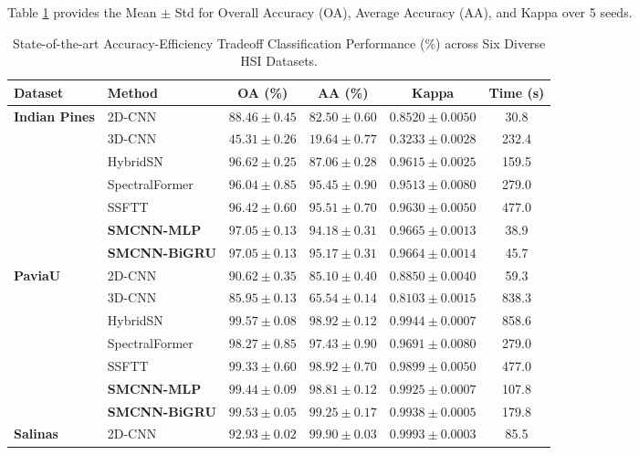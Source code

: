 \documentclass[pdflatex,sn-mathphys-num,iicol]{sn-jnl}
\begin{document}
Table \ref{tab:sota_results} provides the Mean $\pm$ Std for Overall Accuracy (OA), Average Accuracy (AA), and Kappa over 5 seeds.

\begin{table}[htbp]
\centering
\caption{State-of-the-art Accuracy-Efficiency Tradeoff Classification Performance (\%) across Six Diverse HSI Datasets.}
\label{tab:sota_results}
\footnotesize
\begin{tabular}{llcccc}
\toprule
\textbf{Dataset} & \textbf{Method} & \textbf{OA (\%)} & \textbf{AA (\%)} & \textbf{Kappa} & \textbf{Time (s)} \\
\midrule
\multirow{5}{*}{\textbf{Indian Pines}} 
 & 2D-CNN & $88.46 \pm 0.45$ & $82.50 \pm 0.60$ & $0.8520 \pm 0.0050$ & 30.8 \\
 & 3D-CNN & $45.31 \pm 0.26$ & $19.64 \pm 0.77$ & $0.3233 \pm 0.0028$ & 232.4 \\
 & HybridSN & $96.62 \pm 0.25$ & $87.06 \pm 0.28$ & $0.9615 \pm 0.0025$ & 159.5 \\
 & SpectralFormer & $96.04 \pm 0.85$ & $95.45 \pm 0.90$ & $0.9513 \pm 0.0080$ & 279.0 \\
 & SSFTT & $96.42 \pm 0.60$ & $95.51 \pm 0.70$ & $0.9630 \pm 0.0050$ & 477.0 \\
 & \textbf{SMCNN-MLP} & $97.05 \pm 0.13$ & $94.18 \pm 0.31$ & $0.9665 \pm 0.0013$ & 38.9 \\
 & \textbf{SMCNN-BiGRU} & \textbf{$97.05 \pm 0.13$} & \textbf{$95.17 \pm 0.31$} & \textbf{$0.9664 \pm 0.0014$} & 45.7 \\
\midrule
\multirow{5}{*}{\textbf{PaviaU}} 
 & 2D-CNN & $90.62 \pm 0.35$ & $85.10 \pm 0.40$ & $0.8850 \pm 0.0040$ & 59.3 \\
 & 3D-CNN & $85.95 \pm 0.13$ & $65.54 \pm 0.14$ & $0.8103 \pm 0.0015$ & 838.3 \\
 & HybridSN & $99.57 \pm 0.08$ & $98.92 \pm 0.12$ & $0.9944 \pm 0.0007$ & 858.6 \\
 & SpectralFormer & $98.27 \pm 0.85$ & $97.43 \pm 0.90$ & $0.9691 \pm 0.0080$ & 279.0 \\
 & SSFTT & $99.33 \pm 0.60$ & $98.92 \pm 0.70$ & $0.9899 \pm 0.0050$ & 477.0 \\
 & \textbf{SMCNN-MLP} & $99.44 \pm 0.09$ & $98.81 \pm 0.12$ & $0.9925 \pm 0.0007$ & 107.8 \\
 & \textbf{SMCNN-BiGRU} & \textbf{$99.53 \pm 0.05$} & \textbf{$99.25 \pm 0.17$} & \textbf{$0.9938 \pm 0.0005$} & 179.8 \\
\midrule
\multirow{5}{*}{\textbf{Salinas}} & 2D-CNN & $92.93 \pm 0.02$ & $99.90 \pm 0.03$ & $0.9993 \pm 0.0003$ & 85.5 \\

\end{tabular}
\end{table}
\end{document}
